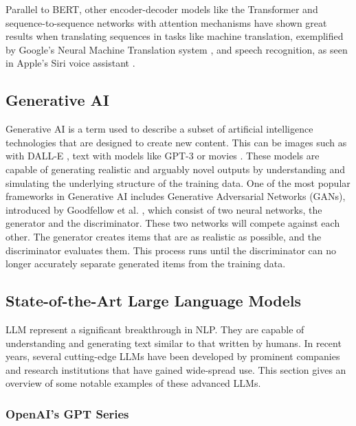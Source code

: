 Parallel to BERT, other encoder-decoder models like the Transformer \cite{vaswani_attention_2023} and sequence-to-sequence networks with attention mechanisms \cite{bahdanau_neural_2016} have shown great results when translating sequences in tasks like machine translation, exemplified by Google's Neural Machine Translation system \cite{wu_googles_2016}, and speech recognition, as seen in Apple's Siri voice assistant \cite{hinton_deep_2012}.


\subsection{Generative AI}


Generative AI is a term used to describe a subset of artificial intelligence technologies that are designed to create new content. This can be images such as with DALL-E \cite{ramesh_zero-shot_2021}, text with models like GPT-3 \cite{brown_language_2020} or movies \cite{openai_video_2024}. These models are capable of generating realistic and arguably novel outputs by understanding and simulating the underlying structure of the training data. One of the most popular frameworks in Generative AI includes Generative Adversarial Networks (GANs), introduced by Goodfellow et al. \cite{goodfellow_generative_2014}, which consist of two neural networks, the generator and the discriminator. These two networks will compete against each other. The generator creates items that are as realistic as possible, and the discriminator evaluates them. This process runs until the discriminator can no longer accurately separate generated items from the training data.


\subsection{State-of-the-Art Large Language Models}


\gls{LLM} represent a significant breakthrough in \gls{NLP}. They are capable of understanding and generating text similar to that written by humans. In recent years, several cutting-edge LLMs have been developed by prominent companies and research institutions that have gained wide-spread use. This section gives an overview of some notable examples of these advanced LLMs.


\label{sec:openai_models}
\subsubsection{OpenAI's GPT Series}


